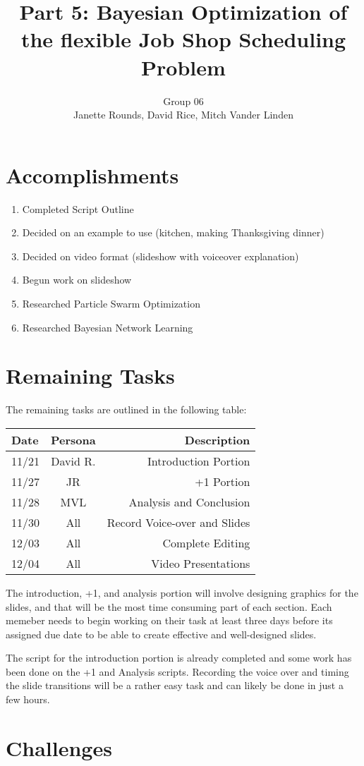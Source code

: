 \documentclass[11pt,twocolumn]{article}
\title{Part 5: Bayesian Optimization of the flexible Job Shop Scheduling Problem}
\author{Group 06 \\ 
\small Janette Rounds, \small David Rice, \small Mitch Vander Linden}
\begin{document}
	\section{Accomplishments}
	\begin{enumerate}
		\item Completed Script Outline
		\item Decided on an example to use (kitchen, making Thanksgiving dinner)
		\item Decided on video format (slideshow with voiceover explanation)
		\item Begun work on slideshow
		\item Researched Particle Swarm Optimization
		\item Researched Bayesian Network Learning
	\end{enumerate}
	\section{Remaining Tasks}
	The remaining tasks are outlined in the following table:
	
	\begin{table}[h!]
	\centering
	\begin{tabular}{ |l | c | r|}
	  \hline
	  Date & Persona & Description \\
	  \hline
	  \hline
	  11/21 & David R. & Introduction Portion \\
	  \hline
	  11/27 & JR & +1 Portion \\
	  \hline
	  11/28 & MVL & Analysis and Conclusion \\
	  \hline
	  11/30 & All & Record Voice-over and Slides \\
	  \hline
	  12/03 & All & Complete Editing \\
	  \hline
	  12/04 & All & Video Presentations \\
	  \hline
	\end{tabular}
	\end{table}
	
	The introduction, +1, and analysis portion will involve designing graphics for the slides, and that will be the most time consuming part of each section.  Each memeber needs to begin working on their task at least three days before its assigned due date to be able to create effective and well-designed slides.
	
	The script for the introduction portion is already completed and some work has been done on the +1 and Analysis scripts.  Recording the voice over and timing the slide transitions will be a rather easy task and can likely be done in just a few hours.
	
	\section{Challenges}
\end{document}
